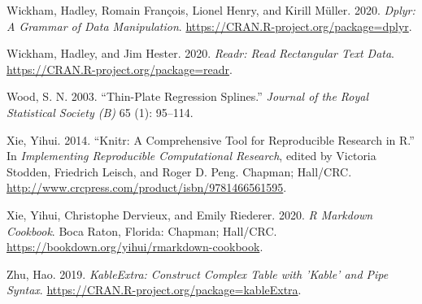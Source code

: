 \documentclass{article}
\begin{document}
\leavevmode\hypertarget{ref-dplyr}{}%
Wickham, Hadley, Romain François, Lionel Henry, and Kirill Müller. 2020. \emph{Dplyr: A Grammar of Data Manipulation}. \url{https://CRAN.R-project.org/package=dplyr}.

\leavevmode\hypertarget{ref-readr}{}%
Wickham, Hadley, and Jim Hester. 2020. \emph{Readr: Read Rectangular Text Data}. \url{https://CRAN.R-project.org/package=readr}.

\leavevmode\hypertarget{ref-mgcv}{}%
Wood, S. N. 2003. ``Thin-Plate Regression Splines.'' \emph{Journal of the Royal Statistical Society (B)} 65 (1): 95--114.

\leavevmode\hypertarget{ref-knitr}{}%
Xie, Yihui. 2014. ``Knitr: A Comprehensive Tool for Reproducible Research in R.'' In \emph{Implementing Reproducible Computational Research}, edited by Victoria Stodden, Friedrich Leisch, and Roger D. Peng. Chapman; Hall/CRC. \url{http://www.crcpress.com/product/isbn/9781466561595}.

\leavevmode\hypertarget{ref-rmarkdown}{}%
Xie, Yihui, Christophe Dervieux, and Emily Riederer. 2020. \emph{R Markdown Cookbook}. Boca Raton, Florida: Chapman; Hall/CRC. \url{https://bookdown.org/yihui/rmarkdown-cookbook}.

\leavevmode\hypertarget{ref-kableExtra}{}%
Zhu, Hao. 2019. \emph{KableExtra: Construct Complex Table with 'Kable' and Pipe Syntax}. \url{https://CRAN.R-project.org/package=kableExtra}.



\end{document}
